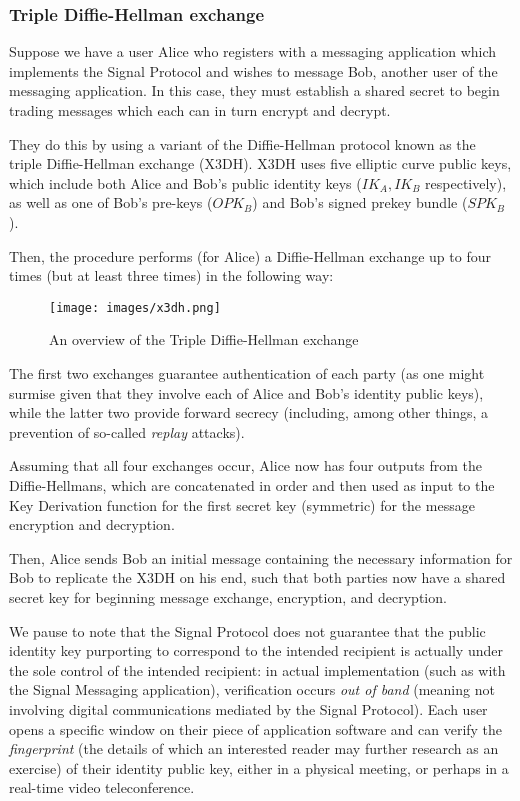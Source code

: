 \documentclass[12pt]{article}
\begin{document}
\subsubsection{Triple Diffie-Hellman exchange}
Suppose we have a user Alice who registers with a messaging application which implements the Signal Protocol and wishes to message Bob, another user of the messaging application. In this case, they must establish a shared secret to begin trading messages which each can in turn encrypt and decrypt. 
\par They do this by using a variant of the Diffie-Hellman protocol known as the triple Diffie-Hellman exchange (X3DH). X3DH uses five elliptic curve public keys, which include both Alice and Bob's public identity keys ($IK_A, IK_B$ respectively), as well as one of Bob's pre-keys ($OPK_B$) and Bob's signed prekey bundle ($SPK_B$).\parencite{website:sigdocX3DH}
\par Then, the procedure performs (for Alice) a Diffie-Hellman exchange up to four times (but at least three times) in the following way: 

\begin{figure}[h!]
    \centering
    \texttt{[image: images/x3dh.png]}
    \caption{An overview of the Triple Diffie-Hellman exchange\parencite{website:sigdocX3DH}}
    \label{fig:my_label2}
\end{figure}

\newpage 
\par The first two exchanges guarantee authentication of each party (as one might surmise given that they involve each of Alice and Bob's identity public keys), while the latter two provide forward secrecy (including, among other things, a prevention of so-called \textit{replay} attacks). 
\par Assuming that all four exchanges occur, Alice now has four outputs from the Diffie-Hellmans, which are concatenated in order and then used as input to the Key Derivation function for the first secret key (symmetric) for the message encryption and decryption.
\par Then, Alice sends Bob an initial message containing the necessary information for Bob to replicate the X3DH on his end, such that both parties now have a shared secret key for beginning message exchange, encryption, and decryption.
\par We pause to note that the Signal Protocol does not guarantee that the public identity key purporting to correspond to the intended recipient is actually under the sole control of the intended recipient: in actual implementation (such as with the Signal Messaging application), verification occurs \textit{out of band} (meaning not involving digital communications mediated by the Signal Protocol). Each user opens a specific window on their piece of application software and can verify the \textit{fingerprint} (the details of which an interested reader may further research as an exercise) of their identity public key, either in a physical meeting, or perhaps in a real-time video teleconference.
 
\end{document}
